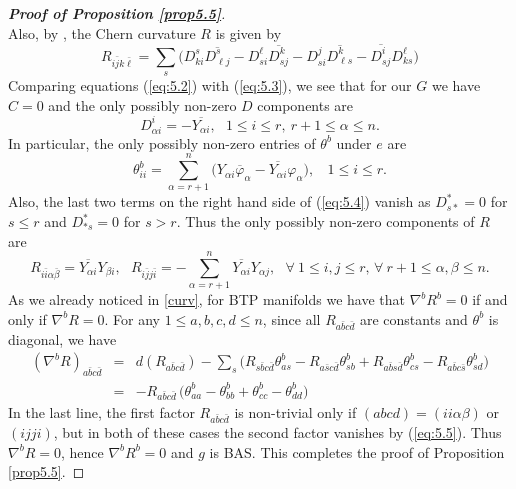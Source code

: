 \documentclass{amsart}
\numberwithin{equation}{section}
\theoremstyle{definition}
\renewcommand{\1}{\mathds{1}}
\renewcommand{\>}{\rightarrow}
\begin{document}
\begin{proof}[{\bf Proof of Proposition \ref{prop5.5}}]
\begin{equation}
 \end{equation}
 Also, by \cite[Lemma 1]{LZ}, the Chern curvature $R$ is given by
\begin{equation} \label{eq:5.4}
R_{i\bar{j}k\bar{\ell}} = \sum_{s} \big( D^s_{ki} \overline{ D^s_{\ell j} } -   D^{\ell}_{si} \overline{ D^k_{s j} } -  D^{j}_{si} \overline{ D^k_{ \ell s} } -   \overline{ D^i_{s j} } D^{\ell}_{ks}  \big)
\end{equation}
Comparing equations (\ref{eq:5.2}) with (\ref{eq:5.3}), we see that for our $G$ we have $C=0$ and the only possibly non-zero $D$ components are
$$ D^i_{\alpha i}=-\overline{Y_{\alpha i} } , \ \ \ 1\leq i\leq r, \ r+1\leq \alpha \leq n. $$
In particular, the only possibly non-zero entries of $\theta^b$ under $e$ are
\begin{equation} \label{eq:5.5}
\theta^b_{ii} = \sum_{\alpha =r+1}^n \big( Y_{\alpha i} \overline{\varphi}_{\alpha} - \overline{Y_{\alpha i}} \varphi_{\alpha}  \big), \ \ \ \ 1\leq i\leq r.
\end{equation}
Also, the last two terms on the right hand side of (\ref{eq:5.4}) vanish as $D^*_{s*}=0$ for $s\leq r$ and $D^*_{*s}=0$ for $s>r$. Thus the only possibly non-zero components of $R$ are
\begin{equation}
R_{i\bar{i}\alpha \bar{\beta}}  = \overline{Y_{\alpha i}} Y_{\beta i}, \ \ \ R_{i\bar{j}j\bar{i}} = -\sum_{\alpha =r+1}^n \overline{Y_{\alpha i}} Y_{\alpha j},   \ \ \ \forall \ 1\leq i,j\leq r, \, \forall \ r+1\leq \alpha ,\beta \leq n.
\end{equation}
 As we already noticed in \eqref{curv}, for {\rm BTP} manifolds we have that $\nabla^bR^b=0$ if and only if $\nabla^bR=0$. For any $1\leq a,b,c,d\leq n$, since all $R_{a\bar{b}c\bar{d}}$ are constants and $\theta^b$ is diagonal, we have
\begin{eqnarray*}
(\nabla^b R)_{a\bar{b}c\bar{d}}  & = & d(R_{a\bar{b}c\bar{d}}) - \sum_s \big( R_{s\bar{b}c\bar{d}} \theta^b_{as} - R_{a\bar{s}c\bar{d}} \theta^b_{sb} + R_{a\bar{b}s\bar{d}} \theta^b_{cs} - R_{a\bar{b}c\bar{s}} \theta^b_{sd} \big) \\
& = &  - R_{a\bar{b}c\bar{d}} \,\big( \theta^b_{aa} -  \theta^b_{bb} + \theta^b_{cc} - \theta^b_{dd} \big)
\end{eqnarray*}
In the last line, the first factor $R_{a\bar{b}c\bar{d}}$ is non-trivial only if $(abcd)=(ii\alpha\beta)$ or $(ijji)$, but in both of these cases the second factor vanishes by (\ref{eq:5.5}). Thus $\nabla^bR=0$, hence $\nabla^bR^b=0$ and $g$ is {\rm BAS}. This completes the proof of Proposition \ref{prop5.5}.
\end{proof}
\end{document}

